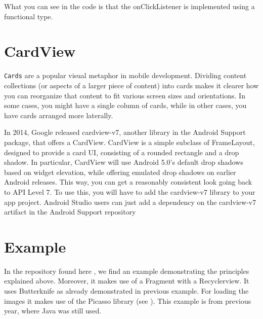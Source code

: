 What you can see in the code is that the onClickListener is implemented using a functional type.



\section{CardView}
\lstinline!Cards! are a popular visual metaphor in mobile development.
Dividing content collections (or aspects of a larger piece of content) into cards makes it clearer how you can reorganize that content to fit various screen sizes and orientations.
In some cases, you might have a single column of cards, while in other cases, you have cards
arranged more laterally.

In 2014, Google released cardview-v7, another library in the Android Support package, that offers a CardView.
CardView is a simple subclass of FrameLayout, designed to provide a card UI, consisting of a rounded rectangle and a drop shadow.
In particular, CardView will use Android 5.0’s default drop shadows based on widget elevation, while offering emulated drop shadows on earlier Android releases.
This
way, you can get a reasonably consistent look going back to API Level 7.
To use this, you will have to add the cardview-v7 library to your app project.
Android Studio users can just add a dependency on the cardview-v7 artifact in the Android Support repository

\section{Example}

\begin{example}
In the repository found here \cite{Buysse2017}, we find an example demonstrating the principles explained above.
Moreover, it makes use of a Fragment with a Recyclerview.
It uses Butterknife as already demonstrated in previous example.
For loading the images it makes use of the Picasso library (see \cite{Square2017}).
This example is from previous year, where Java was still used.
\end{example}



